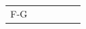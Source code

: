 {\begin{tabular}[t]{|l|l|l|l|l|l|}
     \tabularnewline\cline{1-1}\cline{2-2}\cline{3-3}\cline{4-4}\cline{5-5}\cline{6-6}
        F-G &
         &
         &
         &
         &
     \tabularnewline\cline{1-1}\cline{2-2}\cline{3-3}\cline{4-4}\cline{5-5}\cline{6-6}
    \end{tabular}} %
